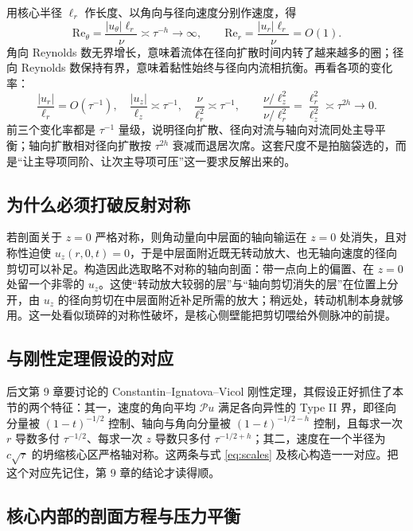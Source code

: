 用核心半径 $\ell_{r}$ 作长度、以角向与径向速度分别作速度，得
\begin{equation}
\mathrm{Re}_{\theta}=\frac{|u_{\theta}|\ell_{r}}{\nu}\asymp\tau^{-h}\to\infty,
\qquad
\mathrm{Re}_{r}=\frac{|u_{r}|\ell_{r}}{\nu}=O(1).
\end{equation}
角向 Reynolds 数无界增长，意味着流体在径向扩散时间内转了越来越多的圈；径向 Reynolds 数保持有界，意味着黏性始终与径向内流相抗衡。再看各项的变化率：
\begin{equation}
\frac{|u_{r}|}{\ell_{r}}=O(\tau^{-1}),\quad
\frac{|u_{z}|}{\ell_{z}}\asymp\tau^{-1},\quad
\frac{\nu}{\ell_{r}^{2}}\asymp\tau^{-1},
\qquad
\frac{\nu/\ell_{z}^{2}}{\nu/\ell_{r}^{2}}=\frac{\ell_{r}^{2}}{\ell_{z}^{2}}\asymp\tau^{2h}\to0 .
\end{equation}
前三个变化率都是 $\tau^{-1}$ 量级，说明径向扩散、径向对流与轴向对流同处主导平衡；轴向扩散相对径向扩散按 $\tau^{2h}$ 衰减而退居次席。这套尺度不是拍脑袋选的，而是“让主导项同阶、让次主导项可压”这一要求反解出来的。

\subsection{为什么必须打破反射对称}

若剖面关于 $z=0$ 严格对称，则角动量向中层面的轴向输运在 $z=0$ 处消失，且对称性迫使 $u_{z}(r,0,t)=0$，于是中层面附近既无转动放大、也无轴向速度的径向剪切可以补足。构造因此选取略不对称的轴向剖面：带一点向上的偏置、在 $z=0$ 处留一个非零的 $u_{z}$。这使“转动放大较弱的层”与“轴向剪切消失的层”在位置上分开，由 $u_{z}$ 的径向剪切在中层面附近补足所需的放大；稍远处，转动机制本身就够用。这一处看似琐碎的对称性破坏，是核心侧壁能把剪切喂给外侧脉冲的前提。

\subsection{与刚性定理假设的对应}

后文第 9 章要讨论的 Constantin--Ignatova--Vicol 刚性定理\cite{civ}，其假设正好抓住了本节的两个特征：其一，速度的角向平均 $\mathcal{P}u$ 满足各向异性的 Type II 界，即径向分量被 $(1-t)^{-1/2}$ 控制、轴向与角向分量被 $(1-t)^{-1/2-h}$ 控制，且每求一次 $r$ 导数多付 $\tau^{-1/2}$、每求一次 $z$ 导数只多付 $\tau^{-1/2+h}$；其二，速度在一个半径为 $c\sqrt{\tau}$ 的坍缩核心区严格轴对称。这两条与式 \eqref{eq:scales} 及核心构造一一对应。把这个对应先记住，第 9 章的结论才读得顺。

\subsection{核心内部的剖面方程与压力平衡}

